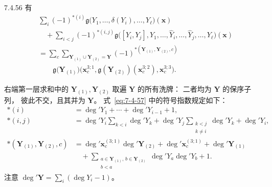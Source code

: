 
\begin{proposition}{7.4.56}\label{prop:7-4-56}
有
\begin{equation}
\begin{aligned}
&\sum_i(-1)^{*(i)}
\mathfrak g\bigl(
Y_1,\ldots,\delta(Y_i),\ldots,Y_\ell
\bigr)(\mathbf x)\\
&\quad+
\sum_{i<j}(-1)^{*(i,j)}
\mathfrak g\bigl(
[Y_i,Y_j],Y_1,\ldots,
\widehat Y_i,\ldots,\widehat Y_j,
\ldots,Y_\ell\bigr)(\mathbf x)\\
&=
\sum_c
\sum_{\mathbf Y_{(1)}
\cup\mathbf Y_{(2)}=\mathbf Y}
(-1)^{*(\mathbf Y_{(1)},\mathbf Y_{(2)},c)}
\\[-0.3ex]
&\qquad
\mathfrak g\bigl(\mathbf Y_{(1)}\bigr)
\bigl(\mathbf x_c^{3;1},
\mathfrak g(\mathbf Y_{(2)})
(\mathbf x_c^{3;2}),
\mathbf x_c^{3;3}\bigr).
\end{aligned}
\tag{7.4.57}\label{eq:7-4-57}
\end{equation}
\end{proposition}

右端第一层求和中的
$\mathbf Y_{(1)},\mathbf Y_{(2)}$
取遍 $\mathbf Y$ 的所有洗牌：
二者均为 $\mathbf Y$ 的保序子列，
彼此不交，且其并为 $\mathbf Y$。
式~\eqref{eq:7-4-57}
中的符号指数规定如下：
\[
\begin{aligned}
*(i)
&=\deg'Y_1+\cdots+\deg'Y_{i-1}+1,\\
*(i,j)
&=\deg'Y_i\sum_{k<i}\deg'Y_k
+\deg'Y_j\sum_{\substack{k<j\\k\ne i}}
\deg'Y_k+\deg'Y_i,\\
*(\mathbf Y_{(1)},\mathbf Y_{(2)},c)
&=\deg'\mathbf x_c^{(3;1)}
\deg'\mathbf Y_{(2)}
+\deg'\mathbf x_c^{(3;1)}
+\deg'\mathbf Y_{(1)}\\
&\quad+
\sum_{\substack{a\in\mathbf Y_{(1)},\,
b\in\mathbf Y_{(2)}\\b<a}}
\deg'Y_a\deg'Y_b+1.
\end{aligned}
\]
注意
$\deg'\mathbf Y
=\sum_i(\deg Y_i-1)$。

